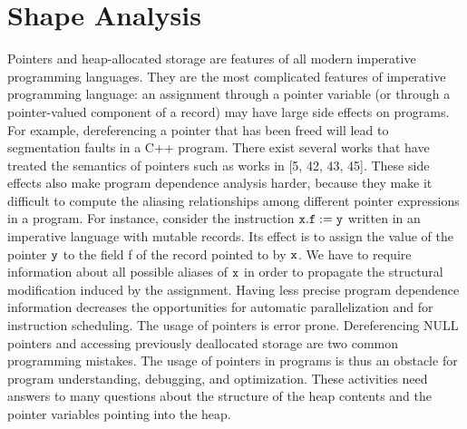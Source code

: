 \chapter{Shape Analysis}
Pointers and heap-allocated storage are features of all modern imperative programming languages.
They are the most complicated features of imperative programming language: an assignment through a
pointer variable (or through a pointer-valued component of a record) may have large side effects on programs. For example, dereferencing a pointer that has been freed will lead to segmentation faults in a C++ program.
There exist several works that have treated the semantics of pointers such as works in [5, 42, 43, 45]. 
These side effects also make program dependence analysis harder, because they make it
difficult to compute the aliasing relationships among different pointer expressions in a program. For instance, consider the instruction $\tt x.f := y$ written in an imperative language with mutable records. Its effect is to assign the value of the pointer $\tt y$ to the  field f of the record pointed to by $\tt x$. We have to require information about all possible aliases of $\tt x$ in order to propagate the structural modification induced by the assignment. Having
less precise program dependence information decreases the opportunities for automatic parallelization
and for instruction scheduling. The usage of pointers is error prone. Dereferencing NULL pointers and accessing previously deallocated storage are two common programming mistakes. The usage of pointers in programs is thus an obstacle for
program understanding, debugging, and optimization. These activities need answers to many questions
about the structure of the heap contents and the pointer variables pointing into the heap. 

